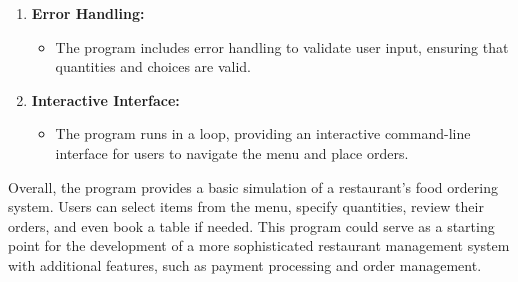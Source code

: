 \documentclass{article}
\begin{document}
\begin{enumerate}[label=\arabic*.]
    \item \textbf{Error Handling:}
    \begin{itemize}
        \item The program includes error handling to validate user input, ensuring that quantities and choices are valid.
    \end{itemize}
    
    \item \textbf{Interactive Interface:}
    \begin{itemize}
        \item The program runs in a loop, providing an interactive command-line interface for users to navigate the menu and place orders.
    \end{itemize}
\end{enumerate}

Overall, the program provides a basic simulation of a restaurant's food ordering system. Users can select items from the menu, specify quantities, review their orders, and even book a table if needed. This program could serve as a starting point for the development of a more sophisticated restaurant management system with additional features, such as payment processing and order management.
\end{document}

